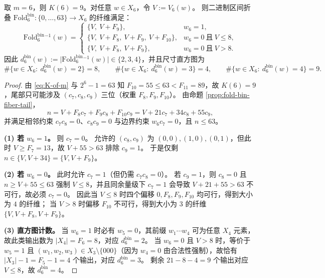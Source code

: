 \begin{corollary}[\texorpdfstring{$m=6$}{m=6} 的显式纤维分类与刚性直方图]\label{cor:fold-bin-m6-fiber-hist}
取 \(m=6\)，则 \(K(6)=9\)。对任意 \(w\in X_6\)，令 \(V:=V_6(w)\)。
则二进制区间折叠 \(\mathrm{Fold}^{\mathrm{bin}}_6:\{0,\dots,63\}\to X_6\) 的纤维满足：
\[
\mathrm{Fold}^{\mathrm{bin}}_6{}^{-1}(w)=
\begin{cases}
\{V,\ V+F_{9}\}, & w_6=1,\\[4pt]
\{V,\ V+F_{8},\ V+F_{9},\ V+F_{10}\}, & w_6=0\ \text{且}\ V\le 8,\\[4pt]
\{V,\ V+F_{8},\ V+F_{9}\}, & w_6=0\ \text{且}\ V> 8.
\end{cases}
\]
因此 \(d^{\mathrm{bin}}_6(w):=\bigl|\mathrm{Fold}^{\mathrm{bin}}_6{}^{-1}(w)\bigr|\in\{2,3,4\}\)，并且尺寸直方图为
\[
\#\{w\in X_6:\ d^{\mathrm{bin}}_6(w)=2\}=8,\qquad
\#\{w\in X_6:\ d^{\mathrm{bin}}_6(w)=3\}=4,\qquad
\#\{w\in X_6:\ d^{\mathrm{bin}}_6(w)=4\}=9.
\]
\end{corollary}
\begin{proof}
由 \eqref{eq:K-of-m} 与 \(2^6-1=63\) 知 \(F_{10}=55\le 63<F_{11}=89\)，故 \(K(6)=9\)，尾部只可能涉及 \((c_7,c_8,c_9)\) 三位（权重 \(F_8,F_9,F_{10}\)）。
由命题 \ref{prop:fold-bin-fiber-tail}，
\[
n=V+F_8c_7+F_9c_8+F_{10}c_9
=V+21c_7+34c_8+55c_9,
\]
并满足相邻约束 \(c_7c_8=0\)、\(c_8c_9=0\) 与边界约束 \(w_6c_7=0\)，且 \(n\le 63\)。
\par
\noindent\textbf{(1) 若 \(w_6=1\)。} 则 \(c_7=0\)。
允许的 \((c_8,c_9)\) 为 \((0,0),(1,0),(0,1)\)，但此时 \(V\ge F_7=13\)，故 \(V+55>63\) 排除 \(c_9=1\)。
于是仅剩 \(n\in\{V,V+34\}=\{V,V+F_9\}\)。
\par
\noindent\textbf{(2) 若 \(w_6=0\)。} 此时允许 \(c_7=1\)（但仍需 \(c_7c_8=0\)）。
若 \(c_9=1\)，则 \(c_8=0\) 且 \(n\ge V+55\le 63\) 强制 \(V\le 8\)，并且同余量级下 \(c_7=1\) 会导致 \(V+21+55>63\) 不可行，故必须 \(c_7=0\)。
因此当 \(V\le 8\) 时四个偏移 \(0,F_8,F_9,F_{10}\) 均可行，得到大小为 \(4\) 的纤维；
当 \(V>8\) 时偏移 \(F_{10}\) 不可行，得到大小为 \(3\) 的纤维 \(\{V,V+F_8,V+F_9\}\)。
\par
\noindent\textbf{(3) 直方图计数。}
当 \(w_6=1\) 时必有 \(w_5=0\)，其前缀 \(w_1\cdots w_4\) 可为任意 \(X_4\) 元素，故此类输出数为 \(|X_4|=F_6=8\)，对应 \(d^{\mathrm{bin}}_6=2\)。
当 \(w_6=0\) 且 \(V>8\) 时，等价于 \(w_5=1\) 且 \((w_1,w_2,w_3)\in X_3\setminus\{000\}\)（因为 \(w_4=0\) 由合法性强制），故恰有 \(|X_3|-1=F_5-1=4\) 个输出，对应 \(d^{\mathrm{bin}}_6=3\)。
剩余 \(21-8-4=9\) 个输出对应 \(V\le 8\)，故 \(d^{\mathrm{bin}}_6=4\)。
\end{proof}

